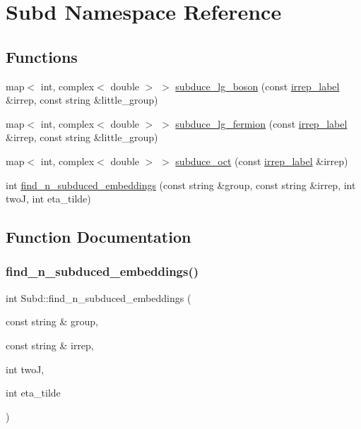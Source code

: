 \hypertarget{namespaceSubd}{}\section{Subd Namespace Reference}
\label{namespaceSubd}
\subsection*{Functions}
\begin{DoxyCompactItemize}
\item 
map$<$ int, complex$<$ double $>$ $>$ \mbox{\hyperlink{namespaceSubd_a5f31b3ef70ad25320a8010ec3017eb04}{subduce\+\_\+lg\+\_\+boson}} (const \mbox{\hyperlink{structirrep__label}{irrep\+\_\+label}} \&irrep, const string \&little\+\_\+group)
\item 
map$<$ int, complex$<$ double $>$ $>$ \mbox{\hyperlink{namespaceSubd_ae7ed68270fb8f7b5f574db245b085586}{subduce\+\_\+lg\+\_\+fermion}} (const \mbox{\hyperlink{structirrep__label}{irrep\+\_\+label}} \&irrep, const string \&little\+\_\+group)
\item 
map$<$ int, complex$<$ double $>$ $>$ \mbox{\hyperlink{namespaceSubd_aa8b77162377de658856d44a4ac5aad26}{subduce\+\_\+oct}} (const \mbox{\hyperlink{structirrep__label}{irrep\+\_\+label}} \&irrep)
\item 
int \mbox{\hyperlink{namespaceSubd_a7a3fcd97f1cf40eb963e278240d0ff3e}{find\+\_\+n\+\_\+subduced\+\_\+embeddings}} (const string \&group, const string \&irrep, int twoJ, int eta\+\_\+tilde)
\end{DoxyCompactItemize}


\subsection{Function Documentation}
\mbox{\label{namespaceSubd_a7a3fcd97f1cf40eb963e278240d0ff3e}} 
\subsubsection{\texorpdfstring{find\_n\_subduced\_embeddings()}{find\_n\_subduced\_embeddings()}}
{\footnotesize\ttfamily int Subd\+::find\+\_\+n\+\_\+subduced\+\_\+embeddings (\begin{DoxyParamCaption}\item[{const string \&}]{group,  }\item[{const string \&}]{irrep,  }\item[{int}]{twoJ,  }\item[{int}]{eta\+\_\+tilde }\end{DoxyParamCaption})}

